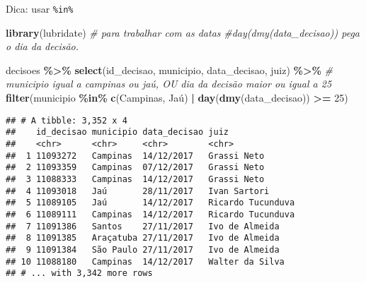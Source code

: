 \documentclass[
  10pt,
  ignorenonframetext,
]{beamer}
\newenvironment{Shaded}{\begin{snugshade}}{\end{snugshade}}
\newcommand{\CommentTok}[1]{\textcolor[rgb]{0.56,0.35,0.01}{\textit{#1}}}
\newcommand{\DecValTok}[1]{\textcolor[rgb]{0.00,0.00,0.81}{#1}}
\newcommand{\KeywordTok}[1]{\textcolor[rgb]{0.13,0.29,0.53}{\textbf{#1}}}
\newcommand{\NormalTok}[1]{#1}
\newcommand{\OperatorTok}[1]{\textcolor[rgb]{0.81,0.36,0.00}{\textbf{#1}}}
\newcommand{\StringTok}[1]{\textcolor[rgb]{0.31,0.60,0.02}{#1}}
\begin{document}
\begin{frame}[fragile]{Dica: usar \texttt{\%in\%}}
\protect\hypertarget{dica-usar-in}{}
\begin{Shaded}
\begin{Highlighting}[]
\KeywordTok{library}\NormalTok{(lubridate) }\CommentTok{\# para trabalhar com as datas}
\CommentTok{\#\textasciigrave{}day(dmy(data\_decisao))\textasciigrave{} pega o dia da decisão. }
\end{Highlighting}
\end{Shaded}

\begin{Shaded}
\begin{Highlighting}[]
\NormalTok{decisoes }\OperatorTok{\%\textgreater{}\%}\StringTok{ }
\StringTok{  }\KeywordTok{select}\NormalTok{(id\_decisao, municipio, data\_decisao, juiz) }\OperatorTok{\%\textgreater{}\%}\StringTok{ }
\StringTok{  }\CommentTok{\# municipio igual a campinas ou jaú, OU dia da decisão maior ou igual a 25}
\StringTok{  }\KeywordTok{filter}\NormalTok{(municipio }\OperatorTok{\%in\%}\StringTok{ }\KeywordTok{c}\NormalTok{(}\StringTok{\textquotesingle{}Campinas\textquotesingle{}}\NormalTok{, }\StringTok{\textquotesingle{}Jaú\textquotesingle{}}\NormalTok{) }\OperatorTok{|}\StringTok{ }\KeywordTok{day}\NormalTok{(}\KeywordTok{dmy}\NormalTok{(data\_decisao)) }\OperatorTok{\textgreater{}=}\StringTok{ }\DecValTok{25}\NormalTok{)}
\end{Highlighting}
\end{Shaded}

\begin{verbatim}
## # A tibble: 3,352 x 4
##    id_decisao municipio data_decisao juiz             
##    <chr>      <chr>     <chr>        <chr>            
##  1 11093272   Campinas  14/12/2017   Grassi Neto      
##  2 11093359   Campinas  07/12/2017   Grassi Neto      
##  3 11088333   Campinas  14/12/2017   Grassi Neto      
##  4 11093018   Jaú       28/11/2017   Ivan Sartori     
##  5 11089105   Jaú       14/12/2017   Ricardo Tucunduva
##  6 11089111   Campinas  14/12/2017   Ricardo Tucunduva
##  7 11091386   Santos    27/11/2017   Ivo de Almeida   
##  8 11091385   Araçatuba 27/11/2017   Ivo de Almeida   
##  9 11091384   São Paulo 27/11/2017   Ivo de Almeida   
## 10 11088180   Campinas  14/12/2017   Walter da Silva  
## # ... with 3,342 more rows
\end{verbatim}
\end{frame}
\end{document}
